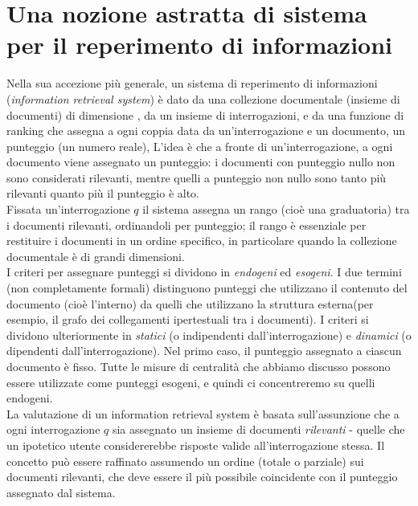 \section{Una nozione astratta di sistema per il reperimento di informazioni}
Nella sua accezione più generale, un sistema di reperimento di informazioni (\textit{information retrieval system}) è dato da una collezione documentale  (insieme di documenti) di dimensione , da un insieme  di interrogazioni, e da una funzione di ranking  che assegna a ogni coppia data da un'interrogazione e un documento, un punteggio (un numero reale), L'idea è che a fronte di un'interrogazione, a ogni documento viene assegnato un punteggio: i documenti con punteggio nullo non sono considerati rilevanti, mentre quelli a punteggio non nullo sono tanto più rilevanti quanto più il punteggio è alto.\\
Fissata un'interrogazione $q$ il sistema assegna un rango (cioè una graduatoria) tra i documenti rilevanti, ordinandoli per punteggio; il rango è essenziale per restituire i documenti in un ordine specifico, in particolare quando la collezione documentale è di grandi dimensioni.\\
I criteri per assegnare punteggi si dividono in \textit{endogeni} ed \textit{esogeni}. I due termini (non completamente formali) distinguono punteggi che utilizzano il contenuto del documento (cioè l'interno) da quelli che utilizzano la struttura esterna(per esempio, il grafo dei collegamenti ipertestuali tra i documenti). I criteri si dividono ulteriormente in \textit{statici} (o indipendenti dall'interrogazione) e \textit{dinamici} (o dipendenti dall'interrogazione). Nel primo caso, il punteggio assegnato a ciascun documento è fisso. Tutte le misure di centralità che abbiamo discusso possono essere utilizzate come punteggi esogeni, e quindi ci concentreremo su quelli endogeni.\\
La valutazione di un information retrieval system è basata sull'assunzione che a ogni interrogazione $q$ sia assegnato un insieme di documenti \textit{rilevanti} - quelle che un ipotetico utente considererebbe risposte valide all'interrogazione stessa. Il concetto può essere raffinato assumendo un ordine (totale o parziale) sui documenti rilevanti, che deve essere il più possibile coincidente con il punteggio assegnato dal sistema.